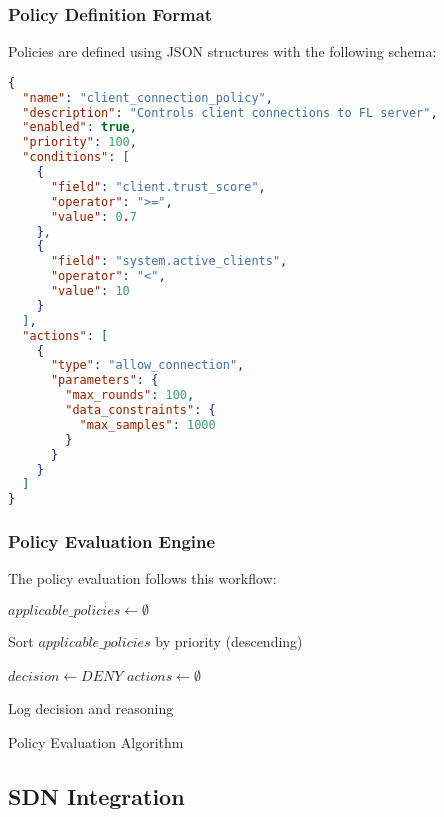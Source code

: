 \documentclass[12pt,a4paper,twoside]{article}
\begin{document}
\subsubsection{Policy Definition Format}

Policies are defined using JSON structures with the following schema:

\begin{lstlisting}[language=json, caption=Policy Definition Example]
{
  "name": "client_connection_policy",
  "description": "Controls client connections to FL server",
  "enabled": true,
  "priority": 100,
  "conditions": [
    {
      "field": "client.trust_score",
      "operator": ">=",
      "value": 0.7
    },
    {
      "field": "system.active_clients",
      "operator": "<",
      "value": 10
    }
  ],
  "actions": [
    {
      "type": "allow_connection",
      "parameters": {
        "max_rounds": 100,
        "data_constraints": {
          "max_samples": 1000
        }
      }
    }
  ]
}
\end{lstlisting}

\subsubsection{Policy Evaluation Engine}

The policy evaluation follows this workflow:

\begin{algorithm}[H]
\SetAlgoLined
{}

$applicable\_policies \leftarrow \emptyset$\;

Sort $applicable\_policies$ by priority (descending)\;

$decision \leftarrow DENY$\;
$actions \leftarrow \emptyset$\;


Log decision and reasoning\;

\caption{Policy Evaluation Algorithm}
\end{algorithm}

\subsection{SDN Integration}
\end{document}

